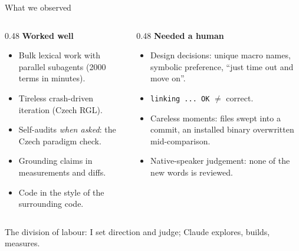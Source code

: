 \documentclass[10pt,aspectratio=169]{beamer}
\newcommand{\bad}[1]{\textcolor{warn}{#1}}
\newcommand{\ok}[1]{\textcolor{good}{#1}}
\begin{document}
\begin{frame}{What we observed}
  \begin{columns}[T]
    \begin{column}{0.48\textwidth}
      \ok{\textbf{Worked well}}
      \begin{itemize}\small
        \item Bulk lexical work with parallel subagents (2000 terms in minutes).
        \item Tireless crash-driven iteration (Czech RGL).
        \item Self-audits \emph{when asked}: the Czech paradigm check.
        \item Grounding claims in measurements and diffs.
        \item Code in the style of the surrounding code.
      \end{itemize}
    \end{column}
    \begin{column}{0.48\textwidth}
      \bad{\textbf{Needed a human}}
      \begin{itemize}\small
        \item Design decisions: unique macro names, symbolic preference,
              ``just time out and move on''.
        \item \texttt{linking ... OK} $\neq$ correct.
        \item Careless moments: files swept into a commit, an installed binary
              overwritten mid-comparison.
        \item Native-speaker judgement: none of the new words is reviewed.
      \end{itemize}
    \end{column}
  \end{columns}
  \vspace{0.5em}
  \centering\small
  The division of labour: I set direction and judge; Claude explores, builds, measures.
\end{frame}
\end{document}
